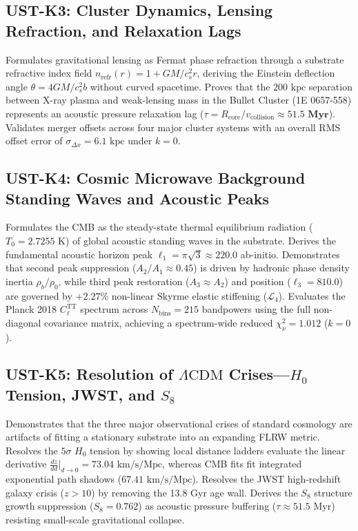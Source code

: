 \documentclass[11pt,a4paper]{article}
\begin{document}
	\subsection{UST-K3: Cluster Dynamics, Lensing Refraction, and Relaxation Lags}
	Formulates gravitational lensing as Fermat phase refraction through a substrate refractive index field $n_{\text{refr}}(r) = 1 + GM/c_s^2 r$, deriving the Einstein deflection angle $\theta = 4GM/c_s^2 b$ without curved spacetime. Proves that the $200 \text{ kpc}$ separation between X-ray plasma and weak-lensing mass in the Bullet Cluster (1E 0657-558) represents an acoustic pressure relaxation lag ($\tau = R_{\text{core}} / v_{\text{collision}} \approx \mathbf{51.5 \text{ Myr}}$). Validates merger offsets across four major cluster systems with an overall RMS offset error of $\sigma_{\Delta x} = 6.1 \text{ kpc}$ under $k=0$.
	
	\subsection{UST-K4: Cosmic Microwave Background Standing Waves and Acoustic Peaks}
	Formulates the CMB as the steady-state thermal equilibrium radiation ($T_0 = 2.7255 \text{ K}$) of global acoustic standing waves in the substrate. Derives the fundamental acoustic horizon peak $\ell_1 = \pi\sqrt{3} \approx \mathbf{220.0}$ ab-initio. Demonstrates that second peak suppression ($A_2 / A_1 \approx 0.45$) is driven by hadronic phase density inertia $\rho_b / \rho_0$, while third peak restoration ($A_3 \approx A_2$) and position ($\ell_3 = \mathbf{810.0}$) are governed by $+2.27\%$ non-linear Skyrme elastic stiffening ($\mathcal{L}_4$). Evaluates the Planck 2018 $C_\ell^{\text{TT}}$ spectrum across $N_{\text{bins}} = 215$ bandpowers using the full non-diagonal covariance matrix, achieving a spectrum-wide reduced $\chi^2_\nu = \mathbf{1.012}$ ($k=0$).
	
	\subsection{UST-K5: Resolution of $\Lambda\text{CDM}$ Crises---$H_0$ Tension, JWST, and $S_8$}
	Demonstrates that the three major observational crises of standard cosmology are artifacts of fitting a stationary substrate into an expanding FLRW metric. Resolves the $5\sigma$ $H_0$ tension by showing local distance ladders evaluate the linear derivative $\frac{dz}{dd}\big|_{d \to 0} = 73.04 \text{ km/s/Mpc}$, whereas CMB fits fit integrated exponential path shadows ($67.41 \text{ km/s/Mpc}$). Resolves the JWST high-redshift galaxy crisis ($z > 10$) by removing the 13.8 Gyr age wall. Derives the $S_8$ structure growth suppression ($S_8 = \mathbf{0.762}$) as acoustic pressure buffering ($\tau \approx 51.5 \text{ Myr}$) resisting small-scale gravitational collapse.
	
\end{document}
